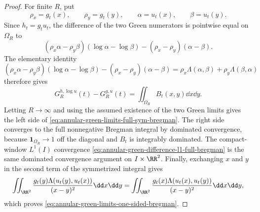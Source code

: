 \begin{proof}
For finite \(R\), put
\[
\rho_x=g_t(x),\qquad \rho_y=g_t(y),\qquad
\alpha=u_t(x),\qquad \beta=u_t(y).
\]
Since \(h_t=g_tu_t\), the difference of the two Green numerators is
pointwise equal on \(\Omega_R\) to
\[
(\rho_x\alpha-\rho_y\beta)(\log\alpha-\log\beta)
-(\rho_x-\rho_y)(\alpha-\beta).
\]
The elementary identity
\[
(\rho_x\alpha-\rho_y\beta)(\log\alpha-\log\beta)
-(\rho_x-\rho_y)(\alpha-\beta)
=\rho_x\Lambda(\alpha,\beta)+\rho_y\Lambda(\beta,\alpha)
\]
therefore gives
\[
G_R^{h,\log u}(t)-G_R^{g,u}(t)
=\iint_{\Omega_R}B_t(x,y)\dd x\dd y .
\]
Letting \(R\to\infty\) and using the assumed existence of the two Green
limits gives the left side of
\eqref{eq:annular-green-limits-full-sym-bregman}.  The right side converges
to the full nonnegative Bregman integral by dominated convergence, because
\(\mathbf1_{\Omega_R}\to1\) off the diagonal and \(B_t\) is integrably
dominated.  The compact-window \(L^1(I)\) convergence
\eqref{eq:annular-green-difference-l1-full-bregman} is the same dominated
convergence argument on \(I\times\RR^2\).  Finally, exchanging \(x\) and
\(y\) in the second term of the symmetrized integral gives
\[
\iint_{\RR^2}
\frac{g_t(y)\Lambda(u_t(y),u_t(x))}{(x-y)^2}\dd x\dd y
=\iint_{\RR^2}
\frac{g_t(x)\Lambda(u_t(x),u_t(y))}{(x-y)^2}\dd x\dd y,
\]
which proves \eqref{eq:annular-green-limits-one-sided-bregman}.
\end{proof}


